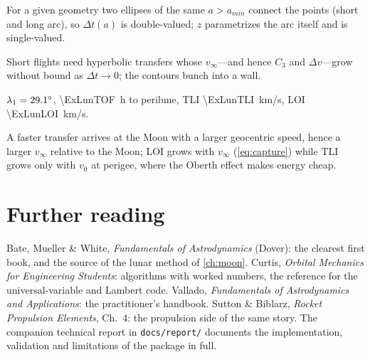 \documentclass[11pt,letterpaper,oneside]{report}
\newcommand{\dv}{\Delta v}
\newcommand{\vinf}{v_\infty}
\newcommand{\code}[1]{\texttt{#1}}
\begin{document}
\begin{description}[style=nextline,leftmargin=0pt,itemsep=2pt]
\item[5.2] For a given geometry two ellipses of the same $a>a_{min}$ connect the points (short and long arc), so $\Delta t(a)$ is double-valued; $z$ parametrizes the arc itself and is single-valued.
\item[5.3] Short flights need hyperbolic transfers whose $\vinf$---and hence $C_3$ and $\dv$---grow without bound as $\Delta t\to0$; the contours bunch into a wall.
\item[6.1] $\lambda_1=\SI{29.1}{\degree}$, \SI{\ExLunTOF}{h} to perilune, TLI \SI{\ExLunTLI}{km/s}, LOI \SI{\ExLunLOI}{km/s}.
\item[6.2] A faster transfer arrives at the Moon with a larger geocentric speed, hence a larger $\vinf$ relative to the Moon; LOI grows with $\vinf$ (\cref{eq:capture}) while TLI grows only with $v_0$ at perigee, where the Oberth effect makes energy cheap.
\end{description}

\chapter{Further reading}
Bate, Mueller \& White, \emph{Fundamentals of Astrodynamics} (Dover): the clearest first book,
and the source of the lunar method of \cref{ch:moon}. Curtis, \emph{Orbital Mechanics for
Engineering Students}: algorithms with worked numbers, the reference for the universal-variable
and Lambert code. Vallado, \emph{Fundamentals of Astrodynamics and Applications}: the
practitioner's handbook. Sutton \& Biblarz, \emph{Rocket Propulsion Elements}, Ch.~4: the
propulsion side of the same story. The companion technical report in \code{docs/report/} documents
the implementation, validation and limitations of the package in full.
\end{document}
